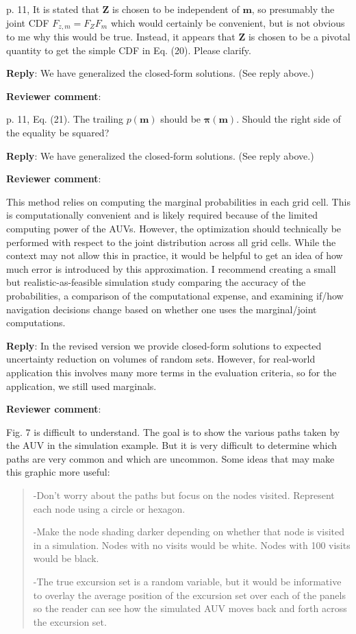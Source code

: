 \documentclass[a4paper]{article}
\newcommand{\bm}{ {\boldsymbol m} }
\newcommand{\bZ}{ {\boldsymbol Z} }
\newcommand{\bpi}{ {\boldsymbol \pi} }
\def\revcom{\textbf{Reviewer comment}}
\def\reply{\textbf{Reply}}
\begin{document}
\begin{answers}
p. 11, It is stated that $\bZ$ is chosen to be independent of $\bm$, so presumably the joint CDF $F_{z,m}=F_{Z}F_m$ which would certainly be convenient, but is not obvious to me why this would be true. 
Instead, it appears that $\bZ$ is chosen to be a pivotal quantity to get the simple CDF in Eq. (20). Please clarify.

\reply: We have generalized the closed-form solutions. (See reply above.)

\item{\revcom :}\label{r2c11}

p. 11, Eq. (21). The trailing $p(\bm)$ should be $\bpi(\bm)$. Should the right side of the equality be squared? 

\reply: We have generalized the closed-form solutions. (See reply above.)

\item{\revcom :}\label{r2c12}

This method relies on computing the marginal probabilities in each grid cell. This is computationally convenient and is likely required because of the limited computing power of the AUVs. However, the optimization should technically be performed with respect to the joint distribution across all grid cells. While the context may not allow this in practice, it would be helpful to get an idea of how much error is introduced by this approximation. I recommend creating a small but realistic-as-feasible simulation study comparing the accuracy of the probabilities, a comparison of the computational expense, and examining if/how navigation decisions change based on whether one uses the marginal/joint computations. 

\reply: In the revised version we provide closed-form solutions to expected uncertainty reduction on volumes of random sets. However, for real-world application this involves many more terms in the evaluation criteria, so for the application, we still used marginals.  

\item{\revcom :}\label{r2c13}

Fig. 7 is difficult to understand. The goal is to show the various paths taken by the AUV in the
simulation example. But it is very difficult to determine which paths are very common and which
are uncommon. Some ideas that may make this graphic more useful:

\begin{quote}
-Don’t worry about the paths but focus on the nodes visited. Represent each node using a circle or hexagon.\par
-Make the node shading darker depending on whether that node is visited in a
simulation. Nodes with no visits would be white. Nodes with 100 visits would be black.\par
-The true excursion set is a random variable, but it would be informative to overlay the
average position of the excursion set over each of the panels so the reader can see how
the simulated AUV moves back and forth across the excursion set.
\end{quote}


\end{answers}
\end{document}
